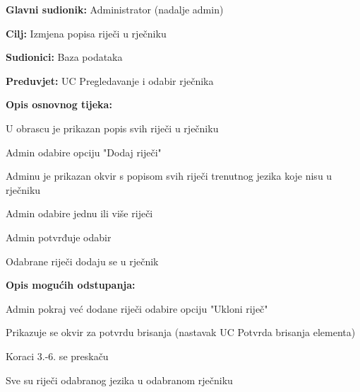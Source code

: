 \noindent {}
\begin{packed_item}

	\item \textbf{Glavni sudionik: } Administrator (nadalje admin)
	\item \textbf{Cilj: } Izmjena popisa riječi u rječniku
	\item \textbf{Sudionici: } Baza podataka
	\item \textbf{Preduvjet: } UC Pregledavanje i odabir rječnika
	\item  \textbf{Opis osnovnog tijeka:}
	
	\item[] \begin{packed_enum}
		
		\item U obrascu je prikazan popis svih riječi u rječniku
		\item Admin odabire opciju "Dodaj riječi"
		\item Adminu je prikazan okvir s popisom svih riječi trenutnog jezika koje nisu u rječniku
		\item Admin odabire jednu ili više riječi
		\item Admin potvrđuje odabir
		\item Odabrane riječi dodaju se u rječnik

	\end{packed_enum}

	\item  \textbf{Opis mogućih odstupanja:}
	
	\item[] \begin{packed_item}

		\item[2.a] Admin pokraj već dodane riječi odabire opciju "Ukloni riječ"
		\item[] \begin{packed_enum}
			
			\item Prikazuje se okvir za potvrdu brisanja (nastavak UC Potvrda brisanja elementa)
			\item Koraci 3.-6. se preskaču
			
		\end{packed_enum}

		\item[3.a] Sve su riječi odabranog jezika u odabranom rječniku
		\item[] \begin{packed_enum}
			

\end{packed_enum}
\end{packed_item}
\end{packed_item}
